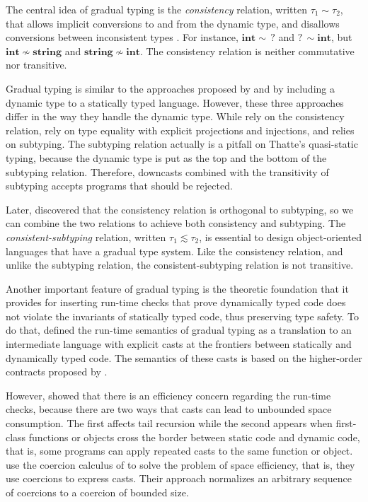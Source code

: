 \documentclass[preprint]{sig-alternate}
\begin{document}
The central idea of gradual typing is the \textit{consistency}
relation, written $\tau_{1} \sim \tau_{2}$, that allows implicit
conversions to and from the dynamic type, and disallows conversions
between inconsistent types \citep{siek2006gradual}.
For instance, $\mathbf{int} \sim \,?$ and $?\, \sim \mathbf{int}$,
but $\mathbf{int} \not\sim \mathbf{string}$ and
$\mathbf{string} \not\sim \mathbf{int}$. 
The consistency relation is neither commutative nor transitive.

Gradual typing is similar to the approaches proposed by
\citet{abadi1989dts} and \citet{thatte1990qst} by including a
dynamic type to a statically typed language.
However, these three approaches differ in the way they handle the
dynamic type.
While \citet{siek2006gradual} rely on the consistency relation,
\citet{abadi1989dts} rely on type equality with explicit projections
and injections, and \citet{thatte1990qst} relies on subtyping.
The subtyping relation actually is a pitfall on Thatte's quasi-static
typing, because the dynamic type is put as the top and the bottom of
the subtyping relation.
Therefore, downcasts combined with the transitivity of subtyping
accepts programs that should be rejected.

Later, \citet{siek2007objects} discovered that the consistency relation
is orthogonal to subtyping, so we can combine the two relations to
achieve both consistency and subtyping.
The \textit{consistent-subtyping} relation,
written $\tau_{1} \lesssim \tau_{2}$,
is essential to design object-oriented languages that have a
gradual type system.
Like the consistency relation, and unlike the subtyping relation,
the consistent-subtyping relation is not transitive.

Another important feature of gradual typing is the theoretic
foundation that it provides for inserting run-time checks that
prove dynamically typed code does not violate the invariants of
statically typed code, thus preserving type safety.
To do that, \citet{siek2006gradual} defined the run-time semantics
of gradual typing as a translation to an intermediate language with
explicit casts at the frontiers between statically and dynamically
typed code.
The semantics of these casts is based on the higher-order contracts
proposed by \citet{findler2002chf}.

However, \citet{herman2007sgt} showed that there is an efficiency
concern regarding the run-time checks, because there are two
ways that casts can lead to unbounded space consumption.
The first affects tail recursion while the second appears when
first-class functions or objects cross the border between
static code and dynamic code, that is, some programs can apply
repeated casts to the same function or object.
\citet{herman2007sgt} use the coercion calculus of
\citet{henglein1994dts} to solve the problem of space efficiency,
that is, they use coercions to express casts.
Their approach normalizes an arbitrary sequence of coercions to a
coercion of bounded size.
\end{document}
